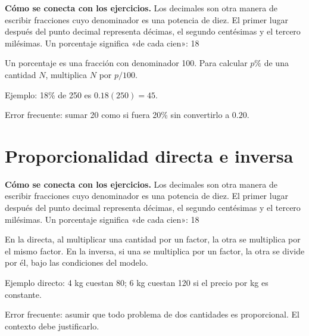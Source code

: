 \documentclass[10pt,oneside,openany]{book}
\begin{document}
\textbf{Cómo se conecta con los ejercicios.} Los decimales son otra manera de escribir fracciones cuyo denominador es una potencia de diez. El primer lugar después del punto decimal representa décimas, el segundo centésimas y el tercero milésimas. Un porcentaje significa «de cada cien»: 18 %

Un porcentaje es una fracción con denominador 100. Para calcular $p\%$ de una cantidad $N$, multiplica $N$ por $p/100$.



\begin{ejemplo}
Ejemplo: 18\% de 250 es $0.18(250)=45$.
\end{ejemplo}

\begin{ojo}
Error frecuente: sumar 20 como si fuera 20\% sin convertirlo a $0.20$.
\end{ojo}



\section{Proporcionalidad directa e inversa}

\textbf{Cómo se conecta con los ejercicios.} Los decimales son otra manera de escribir fracciones cuyo denominador es una potencia de diez. El primer lugar después del punto decimal representa décimas, el segundo centésimas y el tercero milésimas. Un porcentaje significa «de cada cien»: 18 %

En la directa, al multiplicar una cantidad por un factor, la otra se multiplica por el mismo factor. En la inversa, si una se multiplica por un factor, la otra se divide por él, bajo las condiciones del modelo.

\begin{ejemplo}
Ejemplo directo: 4 kg cuestan \textdollar{}80; 6 kg cuestan \textdollar{}120 si el precio por kg es constante.
\end{ejemplo}

\begin{ojo}
Error frecuente: asumir que todo problema de dos cantidades es proporcional. El contexto debe justificarlo.
\end{ojo}
\end{document}
